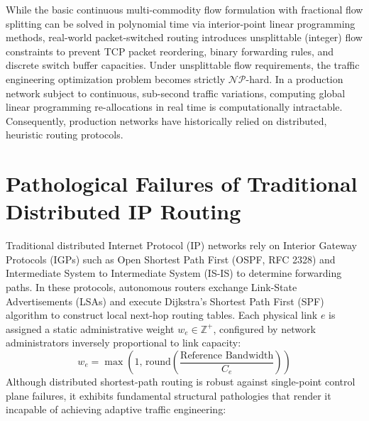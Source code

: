 \documentclass[12pt,a4paper,oneside]{report}
\begin{document}
While the basic continuous multi-commodity flow formulation with fractional flow splitting can be solved in polynomial time via interior-point linear programming methods, real-world packet-switched routing introduces unsplittable (integer) flow constraints to prevent TCP packet reordering, binary forwarding rules, and discrete switch buffer capacities. Under unsplittable flow requirements, the traffic engineering optimization problem becomes strictly $\mathcal{NP}$-hard. In a production network subject to continuous, sub-second traffic variations, computing global linear programming re-allocations in real time is computationally intractable. Consequently, production networks have historically relied on distributed, heuristic routing protocols.

\section{Pathological Failures of Traditional Distributed IP Routing}
Traditional distributed Internet Protocol (IP) networks rely on Interior Gateway Protocols (IGPs) such as Open Shortest Path First (OSPF, RFC 2328) and Intermediate System to Intermediate System (IS-IS) to determine forwarding paths. In these protocols, autonomous routers exchange Link-State Advertisements (LSAs) and execute Dijkstra's Shortest Path First (SPF) algorithm to construct local next-hop routing tables. Each physical link $e$ is assigned a static administrative weight $w_e \in \mathbb{Z}^+$, configured by network administrators inversely proportional to link capacity:
\begin{equation}
    w_e = \max\left(1, \, \text{round}\left(\frac{\text{Reference Bandwidth}}{C_e}\right)\right)
\end{equation}
Although distributed shortest-path routing is robust against single-point control plane failures, it exhibits fundamental structural pathologies that render it incapable of achieving adaptive traffic engineering:
\end{document}
